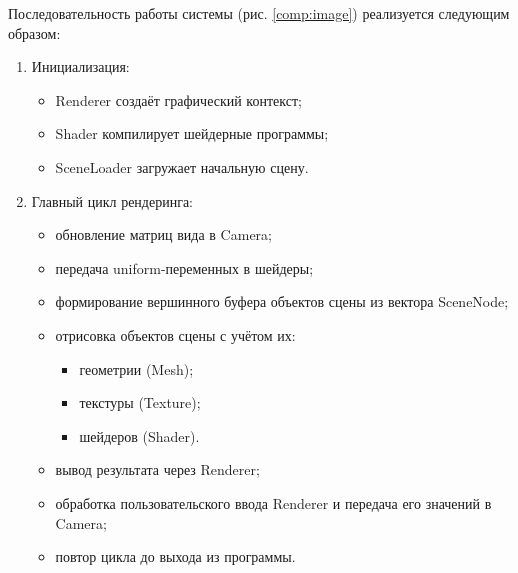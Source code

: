 Последовательность работы системы (рис. \ref{comp:image}) реализуется следующим образом:

\begin{enumerate}
    \item Инициализация:

    \begin{itemize}[itemindent=\parindent,leftmargin=\parindent]
        \item Renderer создаёт графический контекст;
        \item Shader компилирует шейдерные программы;
        \item SceneLoader загружает начальную сцену.
    \end{itemize}

    \item Главный цикл рендеринга:

    \begin{itemize}[itemindent=\parindent,leftmargin=\parindent]
        \item обновление матриц вида в Camera;
        \item передача uniform-переменных в шейдеры;
        \item формирование вершинного буфера объектов сцены из вектора SceneNode;
        \item отрисовка объектов сцены с учётом их:

        \begin{itemize}[itemindent=\parindent,leftmargin=\parindent]
            \item геометрии (Mesh);
            \item текстуры (Texture);
            \item шейдеров (Shader).
        \end{itemize}

        \item вывод результата через Renderer;
        \item обработка пользовательского ввода Renderer и передача его значений в Camera;
        \item повтор цикла до выхода из программы.
    \end{itemize}
\end{enumerate}
